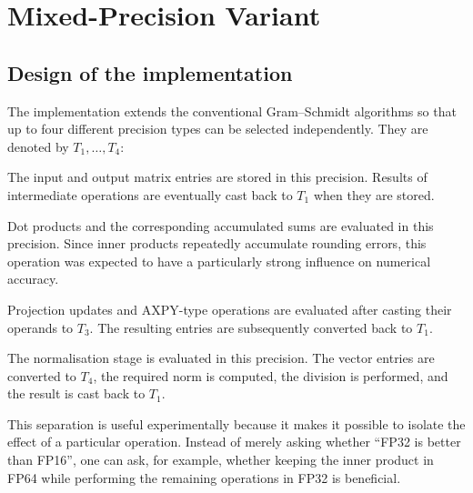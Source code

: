 \documentclass[a4paper,11pt]{article}
\begin{document}
\section{Mixed-Precision Variant}

\subsection{Design of the implementation}

The implementation extends the conventional Gram--Schmidt algorithms so that
up to four different precision types can be selected independently. They are
denoted by $T_1,\ldots,T_4$:

\begin{description}[leftmargin=2.8cm,style=nextline]
    \item[$T_1$ -- storage precision]
    The input and output matrix entries are stored in this precision. Results
    of intermediate operations are eventually cast back to $T_1$ when they
    are stored.

    \item[$T_2$ -- inner-product precision]
    Dot products and the corresponding accumulated sums are evaluated in this
    precision. Since inner products repeatedly accumulate rounding errors,
    this operation was expected to have a particularly strong influence on
    numerical accuracy.

    \item[$T_3$ -- projection/AXPY precision]
    Projection updates and AXPY-type operations are evaluated after casting
    their operands to $T_3$. The resulting entries are subsequently converted
    back to $T_1$.

    \item[$T_4$ -- normalisation precision]
    The normalisation stage is evaluated in this precision. The vector entries
    are converted to $T_4$, the required norm is computed, the division is
    performed, and the result is cast back to $T_1$.
\end{description}

This separation is useful experimentally because it makes it possible to
isolate the effect of a particular operation. Instead of merely asking whether
``FP32 is better than FP16'', one can ask, for example, whether keeping the
inner product in FP64 while performing the remaining operations in FP32 is
beneficial.
\end{document}
